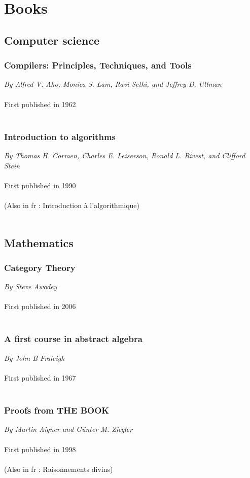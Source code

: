 \documentclass{article}
\begin{document}
    \section{Books}

\subsection{Computer science}
\subsubsection{Compilers: Principles, Techniques, and Tools}
\textit{By Alfred V. Aho, Monica S. Lam, Ravi Sethi, and Jeffrey D. Ullman}\\\\
First published in 1962\\\\
\subsubsection{Introduction to algorithms}
\textit{By Thomas H. Cormen, Charles E. Leiserson, Ronald L. Rivest, and Clifford Stein}\\\\
First published in 1990\\\\
(Also in fr : Introduction à l'algorithmique)\\\\
\subsection{Mathematics}
\subsubsection{Category Theory}
\textit{By Steve Awodey}\\\\
First published in 2006\\\\
\subsubsection{A first course in abstract algebra}
\textit{By John B Fraleigh}\\\\
First published in 1967\\\\
\subsubsection{Proofs from THE BOOK}
\textit{By Martin Aigner and Günter M. Ziegler}\\\\
First published in 1998\\\\
(Also in fr : Raisonnements divins)\\\\
\end{document}
